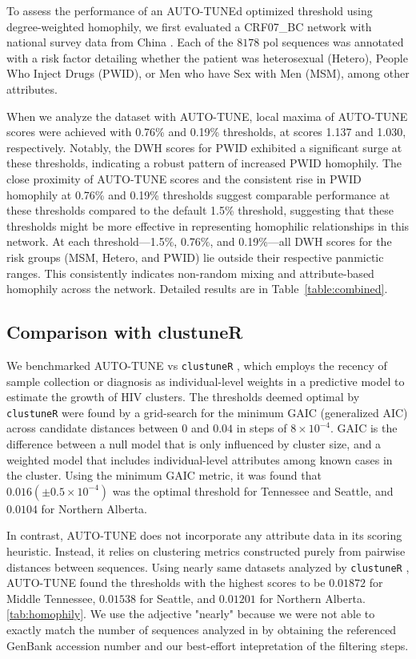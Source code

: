 \documentclass[utf8]{FrontiersinHarvard} %
\begin{document}
To assess the performance of an AUTO-TUNEd optimized threshold using
degree-weighted homophily, we first evaluated a CRF07\_BC network with national
survey data from China \cite{Ge:2021aa} . Each of the $8178$ pol sequences was
annotated with a risk factor detailing whether the patient was heterosexual
(Hetero), People Who Inject Drugs (PWID), or Men who have Sex with Men (MSM),
among other attributes.

When we analyze the dataset with AUTO-TUNE, local maxima of AUTO-TUNE scores
were achieved with 0.76\% and 0.19\% thresholds, at scores 1.137 and 1.030,
respectively. Notably, the DWH scores for PWID exhibited a significant surge at
these thresholds, indicating a robust pattern of increased PWID homophily. The
close proximity of AUTO-TUNE scores and the consistent rise in PWID homophily
at 0.76\% and 0.19\% thresholds suggest comparable performance at these
thresholds compared to the default 1.5\% threshold, suggesting that these
thresholds might be more effective in representing homophilic relationships in
this network. At each threshold—1.5\%, 0.76\%, and 0.19\%—all DWH scores for
the risk groups (MSM, Hetero, and PWID) lie outside their respective panmictic
ranges. This consistently indicates non-random mixing and attribute-based
homophily across the network. Detailed results are in
Table~\ref{table:combined}.

\subsection{Comparison with clustuneR}

We benchmarked AUTO-TUNE vs {\tt clustuneR} \cite{chato_public_2020}, which
employs the recency of sample collection or diagnosis as individual-level
weights in a predictive model to estimate the growth of HIV clusters. The
thresholds deemed optimal by {\tt clustuneR} were found by a grid-search for
the minimum GAIC (generalized AIC) across candidate distances between $0$ and
$0.04$ in steps of $8 \times 10^{-4}$. GAIC is the difference between a null
model that is only influenced by cluster size, and a weighted model that
includes individual-level attributes among known cases in the cluster. Using
the minimum GAIC metric, it was found that $0.016 (\pm 0.5\times 10^{-4})$ was
the optimal threshold for Tennessee and Seattle, and $0.0104$ for Northern
Alberta.

In contrast, AUTO-TUNE does not incorporate any attribute data in its scoring
heuristic. Instead, it relies on clustering metrics constructed purely from
pairwise distances between sequences. Using nearly same datasets analyzed by
	{\tt clustuneR} \citep{chato_public_2020}, AUTO-TUNE found the thresholds with
the highest scores to be $0.01872$ for Middle Tennessee, $0.01538$ for Seattle,
and $0.01201$ for Northern Alberta. \autoref{tab:homophily}. We use the
adjective "nearly" because we were not able to exactly match the number of
sequences analyzed in \citet{chato_public_2020} by obtaining the referenced
GenBank accession number and our best-effort intepretation of the filtering
steps.
\end{document}

